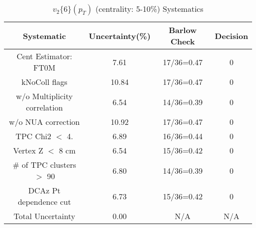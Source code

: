 \begin{table}[htbp]
\caption{$v_2\{6\}(p_{T})$ (centrality: 5-10\%) Systematics}
\label{tab:Sys_pTDiffv26ChFull}
\centering
\begin{tabular}{|c|c|c|c|}
\hline
Systematic & Uncertainty(\%) & Barlow Check & Decision \\
\hline
Cent Estimator: FT0M & 7.61 & 17/36=0.47 & 0 \\
kNoColl flags & 10.84 & 17/36=0.47 & 0 \\
w/o Multiplicity correlation & 6.54 & 14/36=0.39 & 0 \\
w/o NUA correction & 10.92 & 17/36=0.47 & 0 \\
TPC Chi2 $<$ 4. & 6.89 & 16/36=0.44 & 0 \\
Vertex Z $<$ 8 cm & 6.54 & 15/36=0.42 & 0 \\
\# of TPC clusters $>$ 90 & 6.80 & 14/36=0.39 & 0 \\
DCAz Pt dependence cut & 6.73 & 15/36=0.42 & 0 \\
\hline
Total Uncertainty & 0.00 & N/A & N/A \\
\hline
\end{tabular}
\end{table}
